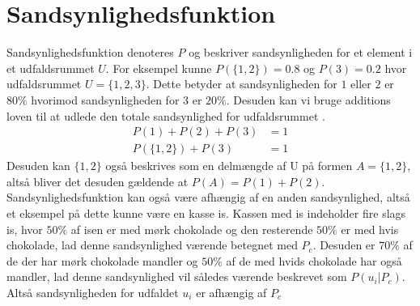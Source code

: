 \documentclass[../../SRP.tex]{subfiles}
\begin{document}
\begin{center}
\qquad
\end{center}
\section{Sandsynlighedsfunktion}

Sandsynlighedsfunktion denoteres $P$ og beskriver sandsynligheden for et element i et udfaldsrummet $U$. For eksempel kunne $P(\{1,2\}) = 0.8$ og $P(3) = 0.2$ hvor udfaldsrummet $U = \{1,2,3\}$. Dette betyder at sandsynligheden for $1$ eller $2$ er $80\%$ hvorimod sandsynligheden for $3$ er $20\%$. Desuden kan vi bruge additions loven til at udlede den totale sandsynlighed for udfaldsrummet \cite{SC}.
\begin{align}
  P(1) + P(2) + P(3) &= 1 \\
  P(\{1,2\}) + P(3) &= 1
\end{align}
Desuden kan $\{1,2\}$ også beskrives som en delmængde af U på formen $A = \{1,2\}$, altså bliver det desuden gældende at $P(A) = P(1) + P(2)$. \\

Sandsynlighedsfunktion kan også være afhængig af en anden sandsynlighed, altså et eksempel på dette kunne være en kasse is. Kassen med is indeholder fire slags is, hvor $50\%$ af isen er med mørk chokolade og den resterende $50\%$ er med hvis chokolade, lad denne sandsynlighed værende betegnet med $P_c$. Desuden er $70\%$ af de der har mørk chokolade mandler og $50\%$ af de med hvids chokolade har også mandler, lad denne sandsynlighed vil således værende beskrevet som $P(u_i | P_c)$. Altså sandsynligheden for udfaldet $u_i$ er afhængig af $P_c$ 
\end{document}
